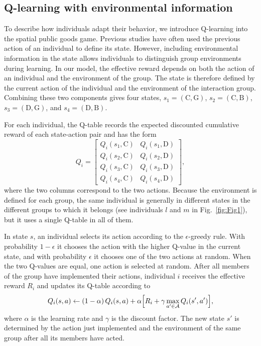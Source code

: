 \documentclass[%
  aip,cha,
  amsmath,amssymb,
  reprint,
  floatfix,
  article-title,
]{revtex4-2}
\begin{document}
\subsection{Q-learning with environmental information}\label{sec:qlearning}

To describe how individuals adapt their behavior, we introduce Q-learning\cite{watkins1992qlearning,sutton2018reinforcement} into the spatial public goods game. Previous studies have often used the previous action of an individual to define its state.\cite{wang2022levy,fan2022incorporating,du2026shaping} However, including environmental information in the state allows individuals to distinguish group environments during learning.\cite{li2025environmental} In our model, the effective reward depends on both the action of an individual and the environment of the group. The state is therefore defined by the current action of the individual and the environment of the interaction group. Combining these two components gives four states, $s_1=(\mathrm{C},\mathrm{G})$, $s_2=(\mathrm{C},\mathrm{B})$, $s_3=(\mathrm{D},\mathrm{G})$, and $s_4=(\mathrm{D},\mathrm{B})$.

For each individual, the Q-table records the expected discounted cumulative reward of each state-action pair and has the form
\begin{equation}
Q_i=
\begin{bmatrix}
Q_i(s_1,\mathrm{C})&Q_i(s_1,\mathrm{D})\\
Q_i(s_2,\mathrm{C})&Q_i(s_2,\mathrm{D})\\
Q_i(s_3,\mathrm{C})&Q_i(s_3,\mathrm{D})\\
Q_i(s_4,\mathrm{C})&Q_i(s_4,\mathrm{D})
\end{bmatrix},
\label{eq:qtable}
\end{equation}
where the two columns correspond to the two actions. Because the environment is defined for each group, the same individual is generally in different states in the different groups to which it belongs (see individuals $l$ and $m$ in Fig.~\ref{fig:Fig1}), but it uses a single Q-table in all of them.

In state $s$, an individual selects its action according to the $\epsilon$-greedy rule. With probability $1-\epsilon$ it chooses the action with the higher Q-value in the current state, and with probability $\epsilon$ it chooses one of the two actions at random. When the two Q-values are equal, one action is selected at random. After all members of the group have implemented their actions, individual $i$ receives the effective reward $R_i$ and updates its Q-table according to
\begin{equation}
Q_i(s,a)\leftarrow(1-\alpha)\,Q_i(s,a)+\alpha\Bigl[R_i+\gamma\max_{a'\in\mathcal{A}}Q_i(s',a')\Bigr],
\label{eq:q-learning}
\end{equation}
where $\alpha$ is the learning rate and $\gamma$ is the discount factor. The new state $s'$ is determined by the action just implemented and the environment of the same group after all its members have acted.
\end{document}
